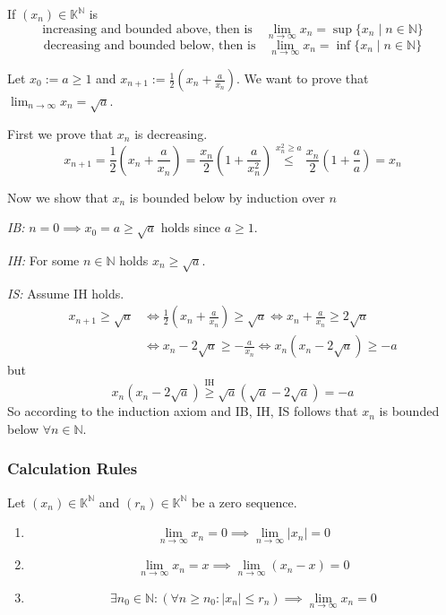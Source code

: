 \begin{theorem}\label{thm:incr_bound_conv}
   If \((x_n) \in \mathbb{K}^\mathbb{N}\) is
   \[\text{increasing and bounded above, then is} \quad \lim_{n \to \infty} x_n = \sup\{x_n \mid n \in \mathbb{N}\}\]
   \[\text{decreasing and bounded below, then is} \quad \lim_{n \to \infty} x_n = \inf\{x_n \mid n \in \mathbb{N}\}\]
\end{theorem}
\begin{example}
   Let \(x_0 := a \geq 1\) and \(x_{n+1} := \frac{1}{2} \left(x_n + \frac{a}{x_n}\right)\).
   We want to prove that \(\lim_{n \to \infty} x_n = \sqrt{a}\).

   First we prove that \(x_n\) is decreasing.
   \[x_{n+1} = \frac{1}{2} \left(x_n + \frac{a}{x_n}\right) = \frac{x_n}{2} \left(1 + \frac{a}{x_n^2}\right) \overset{x_n^2 \geq a}{\leq} \frac{x_n}{2} \left(1 + \frac{a}{a}\right) = x_n\]

   Now we show that \(x_n\) is bounded below by induction over \(n\)

   \textit{IB:} \(n = 0 \implies x_0 = a \geq \sqrt{a}\) holds since \(a \geq 1\).

   \textit{IH:} For some \(n \in \mathbb{N}\) holds \(x_n \geq \sqrt{a}\).

   \textit{IS:} Assume IH holds.
   \begin{equation*}
      \begin{split}
         x_{n+1} \geq \sqrt{a} & \iff \frac{1}{2} \left(x_n + \frac{a}{x_n}\right) \geq \sqrt{a} \iff x_n + \frac{a}{x_n} \geq 2 \sqrt{a}\\
                               & \iff x_n - 2\sqrt{a} \geq - \frac{a}{x_n} \iff x_n(x_n - 2\sqrt{a}) \geq -a
      \end{split}
   \end{equation*}
   but
   \[x_n(x_n - 2 \sqrt{a}) \overset{\text{IH}}{\geq} \sqrt{a}(\sqrt{a} - 2 \sqrt{a}) = -a\]
   So according to the induction axiom and IB, IH, IS follows that \(x_n\) is bounded below \(\forall n \in \mathbb{N}\).
\end{example}

\subsubsection{Calculation Rules}
\begin{lemma}\label{lem:zero_seq}
   Let \((x_n) \in \mathbb{K}^\mathbb{N}\) and \((r_n) \in \mathbb{K}^\mathbb{N}\) be a zero sequence.
   \begin{enumerate}[label=\roman*, align=Center]
      \item \[\lim_{n \to \infty} x_n = 0 \implies \lim_{n \to \infty} \lvert x_n\rvert = 0\]
      \item \[\lim_{n \to \infty} x_n = x \implies \lim_{n \to \infty} (x_n - x) = 0\]
      \item \[\exists n_0 \in \mathbb{N}: (\forall n \geq n_0: |x_n| \leq r_n) \implies \lim_{n \to \infty} x_n = 0\]
   \end{enumerate}
\end{lemma}

